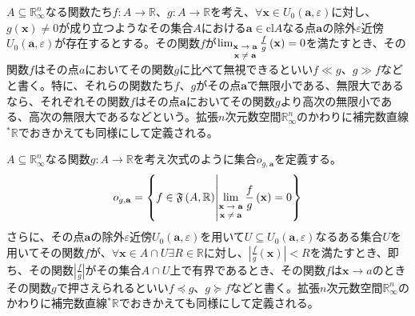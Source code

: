 \documentclass[dvipdfmx]{jsarticle}
\begin{document}
\begin{dfn}
$A \subseteq \mathbb{R}_{\infty}^{n}$なる関数たち$f:A \rightarrow \mathbb{R}$、$g:A \rightarrow \mathbb{R}$を考え、$\forall\mathbf{x} \in U_{0}\left( \mathbf{a},\varepsilon \right)$に対し、$g\left( \mathbf{x} \right) \neq 0$が成り立つようなその集合$A$における$\mathbf{a} \in \mathrm{cl}A$なる点$\mathbf{a}$の除外$\varepsilon$近傍$U_{0}\left( \mathbf{a},\varepsilon \right)$が存在するとする。その関数$f$が$\lim_{\scriptsize \begin{matrix}
\mathbf{x} \rightarrow \mathbf{a} \\
\mathbf{x} \neq \mathbf{a} \\
\end{matrix}}{\frac{f}{g}\left( \mathbf{x} \right)} = 0$を満たすとき、その関数$f$はその点$a$においてその関数$g$に比べて無視できるといい$f \ll g$、$g \gg f$などと書く。特に、それらの関数たち$f$、$g$がその点$\mathbf{a}$で無限小である、無限大であるなら、それぞれその関数$f$はその点$\mathbf{a}$においてその関数$g$より高次の無限小である、高次の無限大であるなどという。拡張$n$次元数空間$\mathbb{R}_{\infty}^{n}$のかわりに補完数直線${}^{*}\mathbb{R}$でおきかえても同様にして定義される。
\end{dfn}
\begin{dfn}
$A \subseteq \mathbb{R}_{\infty}^{n}$なる関数$g:A \rightarrow \mathbb{R}$を考え次式のように集合$o_{g,\mathbf{a}}$を定義する。
\begin{align*}
o_{g,\mathbf{a}} = \left\{ f \in \mathfrak{F}\left( A,\mathbb{R} \right) \middle| \lim_{\scriptsize \begin{matrix}
\mathbf{x} \rightarrow \mathbf{a} \\
\mathbf{x} \neq \mathbf{a} \\
\end{matrix}}{\frac{f}{g}\left( \mathbf{x} \right)} = 0 \right\}
\end{align*}
さらに、その点$\mathbf{a}$の除外$\varepsilon$近傍$U_{0}\left( \mathbf{a},\varepsilon \right)$を用いて$U \subseteq U_{0}\left( \mathbf{a},\varepsilon \right)$なるある集合$U$を用いてその関数$f$が、$\forall\mathbf{x} \in A \cap U\exists R \in \mathbb{R}$に対し、$\left| \frac{f}{g}\left( \mathbf{x} \right) \right| < R$を満たすとき、即ち、その関数$\left| \frac{f}{g} \right|$がその集合$A \cap U$上で有界であるとき、その関数$f$は$\mathbf{x} \rightarrow a$のときその関数$g$で押さえられるといい$f \preccurlyeq g$、$g \succcurlyeq f$などと書く。拡張$n$次元数空間$\mathbb{R}_{\infty}^{n}$のかわりに補完数直線${}^{*}\mathbb{R}$でおきかえても同様にして定義される。
\end{dfn}
\end{document}
